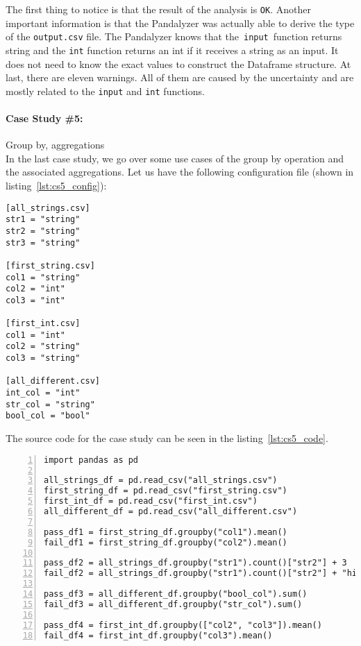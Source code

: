 The first thing to notice is that the result of the analysis is \verb|OK|.
Another important information is that the Pandalyzer was actually able to derive the type of the \verb|output.csv| file.
The Pandalyzer knows that the~\verb|input|~function returns string and the \verb|int| function returns an int if
it receives a string as an input.
It does not need to know the exact values to construct the Dataframe structure.
At last, there are eleven warnings.
All of them are caused by the uncertainty and are mostly related to the \verb|input| and \verb|int| functions.


\paragraph{Case Study \#5:} Group by, aggregations \\

In the last case study, we go over some use cases of the group by operation and the associated aggregations.
Let us have the following configuration file (shown in listing~\ref{lst:cs5_config}):

\begin{lstlisting}[caption=config.toml file for the fifth case study, label={lst:cs5_config}, captionpos=b]
[all_strings.csv]
str1 = "string"
str2 = "string"
str3 = "string"

[first_string.csv]
col1 = "string"
col2 = "int"
col3 = "int"

[first_int.csv]
col1 = "int"
col2 = "string"
col3 = "string"

[all_different.csv]
int_col = "int"
str_col = "string"
bool_col = "bool"
\end{lstlisting}

The source code for the case study can be seen in the listing~\ref{lst:cs5_code}.

\begin{lstlisting}[caption=Code of the fifth case study in Pandas, label={lst:cs5_code}, captionpos=b, numbers=left]
import pandas as pd

all_strings_df = pd.read_csv("all_strings.csv")
first_string_df = pd.read_csv("first_string.csv")
first_int_df = pd.read_csv("first_int.csv")
all_different_df = pd.read_csv("all_different.csv")

pass_df1 = first_string_df.groupby("col1").mean()
fail_df1 = first_string_df.groupby("col2").mean()

pass_df2 = all_strings_df.groupby("str1").count()["str2"] + 3
fail_df2 = all_strings_df.groupby("str1").count()["str2"] + "hi"

pass_df3 = all_different_df.groupby("bool_col").sum()
fail_df3 = all_different_df.groupby("str_col").sum()

pass_df4 = first_int_df.groupby(["col2", "col3"]).mean()
fail_df4 = first_int_df.groupby("col3").mean()
\end{lstlisting}

